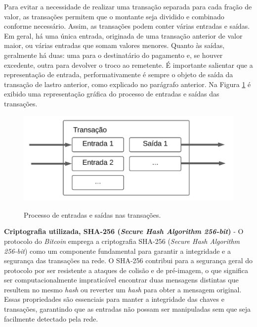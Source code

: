 \documentclass[article,12pt,oneside,a4paper,english,brazil]{unifil}
\begin{document}
\begin{Spacing}{1.5}
\begin{figure}[H]
\end{figure}

Para evitar a necessidade de realizar uma transação separada para cada fração de valor, as transações permitem que o montante seja dividido e combinado conforme necessário. Assim, as transações podem conter várias entradas e saídas. Em geral, há uma única entrada, originada de uma transação anterior de valor maior, ou várias entradas que somam valores menores. Quanto às saídas, geralmente há duas: uma para o destinatário do pagamento e, se houver excedente, outra para devolver o troco ao remetente. É importante salientar que a representação de entrada, performativamente é sempre o objeto de saída da transação de lastro anterior, como explicado no parágrafo anterior. Na Figura \ref*{fig:input} é exibido uma representação gráfica do processo de entradas e saídas das transações.

\begin{figure}[H]
	\centering
	\captionsetup{justification=centering}
	\caption{Processo de entradas e saídas nas transações.}
	\includegraphics[width=.8\linewidth]{../images/figura 3.png}
	\label{fig:input}

\end{figure}

\textbf{Criptografia utilizada, SHA-256 (\textit{Secure Hash Algorithm 256-bit})} - O protocolo do \textit{Bitcoin} emprega a criptografia SHA-256 (\textit{Secure Hash Algorithm 256-bit}) como um componente fundamental para garantir a integridade e a segurança das transações na rede. O SHA-256 contribui para a segurança geral do protocolo por ser resistente a ataques de colisão e de pré-imagem, o que significa ser computacionalmente impraticável encontrar duas mensagens distintas que resultem no mesmo \textit{hash} ou reverter um \textit{hash} para obter a mensagem original. Essas propriedades são essenciais para manter a integridade das chaves e transações, garantindo que as entradas não possam ser manipuladas sem que seja facilmente detectado pela rede.


\end{Spacing}
\end{document}
